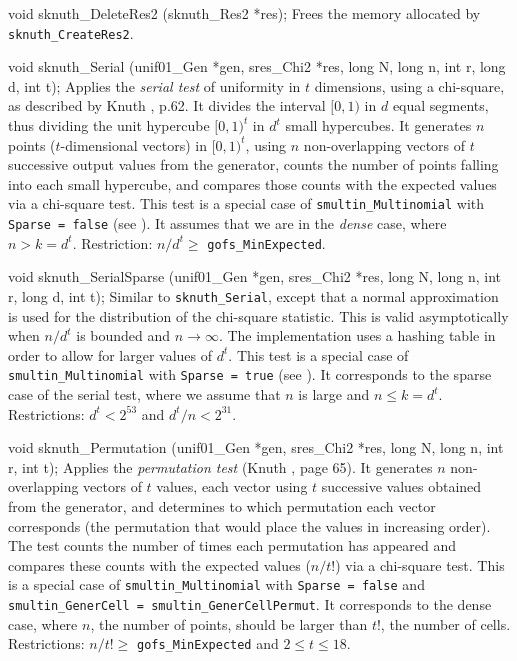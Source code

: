 void sknuth_DeleteRes2 (sknuth_Res2 *res);
\endcode
 \tab
  Frees the memory allocated by {\tt sknuth\_CreateRes2}.
 \endtab




\fi %



\code

void sknuth_Serial (unif01_Gen *gen, sres_Chi2 *res,
                    long N, long n, int r, long d, int t);
\endcode
 \tab
  Applies the {\em serial test\/} of uniformity
  in $t$ dimensions,
  using a chi-square, as described by Knuth \cite{rKNU98a}, p.62.
  It divides the interval $[0,1)$ in $d$ equal segments, thus dividing
  the unit hypercube $[0,1)^t$ in $d^{t}$ small hypercubes.
  It generates $n$ points ($t$-dimensional vectors) in $[0,1)^t$,
  using $n$ non-overlapping vectors of $t$ successive output values
  from the generator, counts the number of points falling into
  each small hypercube, and compares those counts with the expected
  values via a chi-square test.
  This test is a special case of {\tt smultin\_Multinomial} with
  {\tt Sparse = false} (see \cite{rLEC02c}).
  It assumes that we are in the {\em dense\/} case, where
  $n > k = d^t$.
  Restriction: $n / d^{t}\ge$ {\tt gofs\_MinExpected}.
 \endtab
\code


void sknuth_SerialSparse (unif01_Gen *gen, sres_Chi2 *res,
                          long N, long n, int r, long d, int t);
\endcode
 \tab
  Similar
   to {\tt sknuth\_Serial}, except that a normal approximation
  is used for the distribution of the chi-square statistic.
  This is valid asymptotically when $n / d^t$ is bounded and
  $n\to\infty$.
  The implementation uses a hashing table in order to allow for
  larger values of $d^t$.
  This test is a special case of {\tt smultin\_Multinomial} with
  {\tt Sparse = true} (see \cite{rLEC02c}).
  It corresponds to the sparse case of the serial test, where we assume
  that $n$ is large and $n \le k = d^t$.
  Restrictions: $d^t < 2^{53}$ and $d^{t}/n < 2^{31}$.
 \endtab
\code


void sknuth_Permutation (unif01_Gen *gen, sres_Chi2 *res,
                         long N, long n, int r, int t);
\endcode
 \tab
   Applies
   the {\em permutation test\/} (Knuth \cite{rKNU98a}, page 65).
   It generates $n$ non-overlapping vectors of $t$ values, each vector
   using $t$ successive values obtained from the generator,
   and determines to which permutation each vector corresponds
   (the permutation that would place the values in increasing order).
   The test counts the number of times each permutation has appeared
   and compares these counts with the expected values ($n/t!$)
   via a chi-square test.
   This is a special case of {\tt smultin\_Multinomial} with
   {\tt Sparse = false} and
   {\tt smultin\_Gener\-Cell = smultin\_GenerCellPermut}.
   It corresponds to the dense case, where  $n$,
   the number of points, should be larger than  $t!$, the number of cells.
   Restrictions: $n/t! \ge$ {\tt gofs\_MinExpected} and $2 \le t \le 18$.
 \endtab
\code


